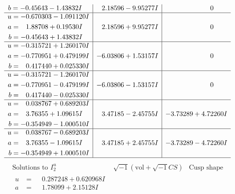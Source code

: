 \documentclass[1p]{elsarticle_modified}
\theoremstyle{definition}
\newcommand{\I}{\sqrt{-1}}
\begin{document}
$$\begin{array}{c|c|c}
\begin{aligned}
b &= -0.45643 - 1.43832 I\end{aligned}
 & \phantom{-}2.18596 - 9.95277 I & \phantom{-0.000000 } 0 \\ \hline\begin{aligned}
u &= -0.670303 - 1.091120 I \\
a &= \phantom{-}1.88708 + 0.19530 I \\
b &= -0.45643 + 1.43832 I\end{aligned}
 & \phantom{-}2.18596 + 9.95277 I & \phantom{-0.000000 } 0 \\ \hline\begin{aligned}
u &= -0.315721 + 1.260170 I \\
a &= -0.770951 + 0.479199 I \\
b &= \phantom{-}0.417440 + 0.025330 I\end{aligned}
 & -6.03806 + 1.53157 I & \phantom{-0.000000 } 0 \\ \hline\begin{aligned}
u &= -0.315721 - 1.260170 I \\
a &= -0.770951 - 0.479199 I \\
b &= \phantom{-}0.417440 - 0.025330 I\end{aligned}
 & -6.03806 - 1.53157 I & \phantom{-0.000000 } 0 \\ \hline\begin{aligned}
u &= \phantom{-}0.038767 + 0.689203 I \\
a &= \phantom{-}3.76355 + 1.09615 I \\
b &= -0.354949 - 1.000510 I\end{aligned}
 & \phantom{-}3.47185 - 2.45755 I & -3.73289 + 4.72260 I \\ \hline\begin{aligned}
u &= \phantom{-}0.038767 - 0.689203 I \\
a &= \phantom{-}3.76355 - 1.09615 I \\
b &= -0.354949 + 1.000510 I\end{aligned}
 & \phantom{-}3.47185 + 2.45755 I & -3.73289 - 4.72260 I\\
 \hline 
 \end{array}$$\newpage$$\begin{array}{c|c|c}  
\text{Solutions to }I^u_{2}& \I (\text{vol} + \sqrt{-1}CS) & \text{Cusp shape}\\
 \hline 
\begin{aligned}
u &= \phantom{-}0.287248 + 0.620968 I \\
a &= \phantom{-}1.78099 + 2.15128 I \\

\end{aligned}
\end{array}$$
\end{document}
